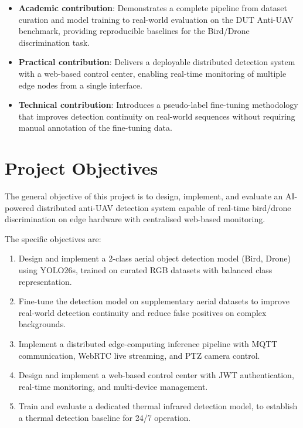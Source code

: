 \documentclass[12pt,a4paper]{report}
\begin{document}
\begin{itemize}
  \item \textbf{Academic contribution}: Demonstrates a complete pipeline
        from dataset curation and model training to real-world evaluation
        on the DUT Anti-UAV benchmark, providing reproducible baselines
        for the Bird/Drone discrimination task.
  \item \textbf{Practical contribution}: Delivers a deployable distributed
        detection system with a web-based control center, enabling real-time
        monitoring of multiple edge nodes from a single interface.
  \item \textbf{Technical contribution}: Introduces a pseudo-label fine-tuning
        methodology that improves detection continuity on real-world sequences
        without requiring manual annotation of the fine-tuning data.
\end{itemize}

\section{Project Objectives}

The general objective of this project is to design, implement, and evaluate
an AI-powered distributed anti-UAV detection system capable of real-time
bird/drone discrimination on edge hardware with centralised web-based monitoring.

The specific objectives are:

\begin{enumerate}
  \item Design and implement a 2-class aerial object detection model (Bird, Drone)
        using YOLO26s, trained on curated RGB datasets with balanced class representation.
  \item Fine-tune the detection model on supplementary aerial datasets to improve
        real-world detection continuity and reduce false positives on complex backgrounds.
  \item Implement a distributed edge-computing inference pipeline with
        MQTT communication, WebRTC live streaming, and PTZ camera control.
  \item Design and implement a web-based control center with JWT authentication,
        real-time monitoring, and multi-device management.
  \item Train and evaluate a dedicated thermal infrared detection model,
        to establish a thermal detection baseline for 24/7 operation.
\end{enumerate}
\end{document}
